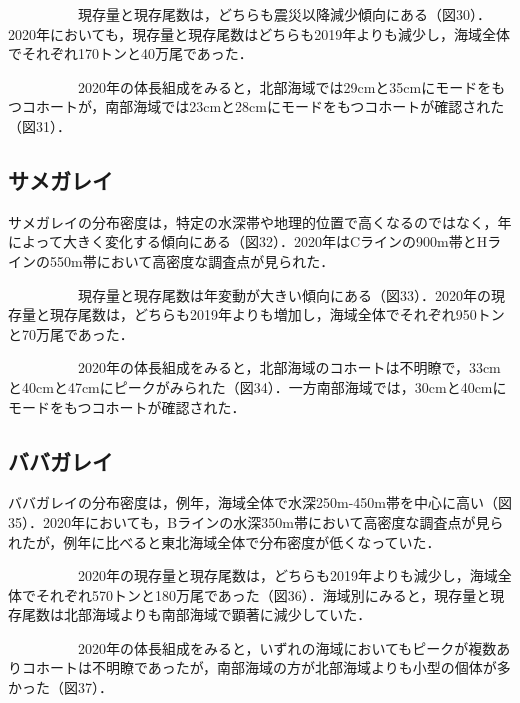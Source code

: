 \documentclass[11pt]{article} %
\begin{document}
\begin{linenumbers}
\ \ \ \ \ \ \ \ \ \ 
現存量と現存尾数は，どちらも震災以降減少傾向にある（図30）．2020年においても，現存量と現存尾数はどちらも2019年よりも減少し，海域全体でそれぞれ170トンと40万尾であった．

\ \ \ \ \ \ \ \ \ \ 
2020年の体長組成をみると，北部海域では29cmと35cmにモードをもつコホートが，南部海域では23cmと28cmにモードをもつコホートが確認された（図31）．


\subsection{サメガレイ}
サメガレイの分布密度は，特定の水深帯や地理的位置で高くなるのではなく，年によって大きく変化する傾向にある（図32）．2020年はCラインの900m帯とHラインの550m帯において高密度な調査点が見られた．

\ \ \ \ \ \ \ \ \ \ 
現存量と現存尾数は年変動が大きい傾向にある（図33）．2020年の現存量と現存尾数は，どちらも2019年よりも増加し，海域全体でそれぞれ950トンと70万尾であった．

\ \ \ \ \ \ \ \ \ \ 
2020年の体長組成をみると，北部海域のコホートは不明瞭で，33cmと40cmと47cmにピークがみられた（図34）．一方南部海域では，30cmと40cmにモードをもつコホートが確認された．


\subsection{ババガレイ}
ババガレイの分布密度は，例年，海域全体で水深250m-450m帯を中心に高い（図35）．2020年においても，Bラインの水深350m帯において高密度な調査点が見られたが，例年に比べると東北海域全体で分布密度が低くなっていた．

\ \ \ \ \ \ \ \ \ \ 
2020年の現存量と現存尾数は，どちらも2019年よりも減少し，海域全体でそれぞれ570トンと180万尾であった（図36）．海域別にみると，現存量と現存尾数は北部海域よりも南部海域で顕著に減少していた．


\ \ \ \ \ \ \ \ \ \ 
2020年の体長組成をみると，いずれの海域においてもピークが複数ありコホートは不明瞭であったが，南部海域の方が北部海域よりも小型の個体が多かった（図37）．


\end{linenumbers}
\end{document}
